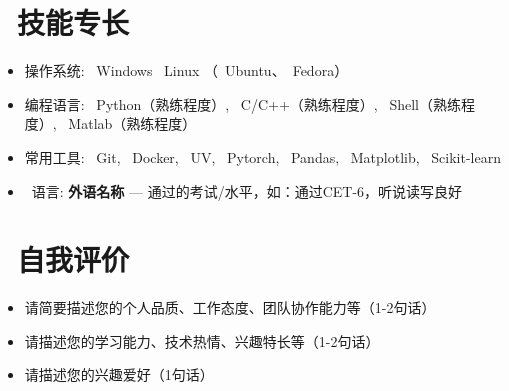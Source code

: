 \documentclass{resume}
\begin{document}
\section{{\color{darkeraccent}\faCode~技能专长}}
\begin{itemize}
	\item 操作系统: \win~Windows \linux~Linux （\ubuntu~Ubuntu、\fedora~Fedora）
	\item 编程语言: \py~Python（熟练程度）, \cpp~C/C++（熟练程度）, \bash~Shell（熟练程度）, \matlab~Matlab（熟练程度）
	\item 常用工具: \git~Git, \docker~Docker, \uv~UV, \torch~Pytorch, \pandas~Pandas, \matplotlib~Matplotlib, \sklearn~Scikit-learn
	\item \faLanguage~语言: \textbf{外语名称} --- 通过的考试/水平，如：通过CET-6，听说读写良好
\end{itemize}

\section{{\color{darkeraccent}\faUser~自我评价}}
\begin{itemize}
	\item 请简要描述您的个人品质、工作态度、团队协作能力等（1-2句话）
	\item 请描述您的学习能力、技术热情、兴趣特长等（1-2句话）
	\item 请描述您的兴趣爱好（1句话）
\end{itemize}
\end{document}

